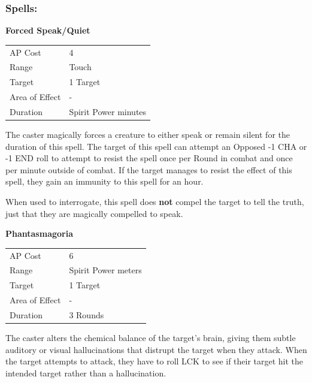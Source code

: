 \documentclass[11pt,a4paper,twocolumn]{book}
\begin{document}
\vfill
\subsubsection*{Spells:}

\smallskip
\noindent
\textbf{Forced Speak/Quiet}

\smallskip
{
	\begin{tabu} to 70mm{| X[l,4] | X[l,7] |}
		\hline
        AP Cost	      	& 4 						\\
        Range     		& Touch				\\
        Target      	& 1 Target		\\
        Area of Effect  & -  	 			\\
        Duration     	& Spirit Power minutes		\\ \hline
	\end{tabu}
		
}
\smallskip

The caster magically forces a creature to either speak or remain silent for the duration of this spell. The target of this spell can attempt an Opposed -1 CHA or -1 END roll to attempt to resist the spell once per Round in combat and once per minute outside of combat. If the target manages to resist the effect of this spell, they gain an immunity to this spell for an hour.

When used to interrogate, this spell does \textbf{not} compel the target to tell the truth, just that they are magically compelled to speak.

\bigskip
\noindent
\textbf{Phantasmagoria}

\smallskip
{
	\begin{tabu} to 70mm{| X[l,4] | X[l,7] |}
		\hline
        AP Cost	      	& 6 						\\
        Range     		& Spirit Power meters				\\
        Target      	& 1 Target		\\
        Area of Effect  & -  	 			\\
        Duration     	& 3 Rounds		\\ \hline
	\end{tabu}
		
}
\smallskip

The caster alters the chemical balance of the target's brain, giving them subtle auditory or visual hallucinations that distrupt the target when they attack. When the target attempts to attack, they have to roll LCK to see if their target hit the intended target rather than a hallucination.
\end{document}
